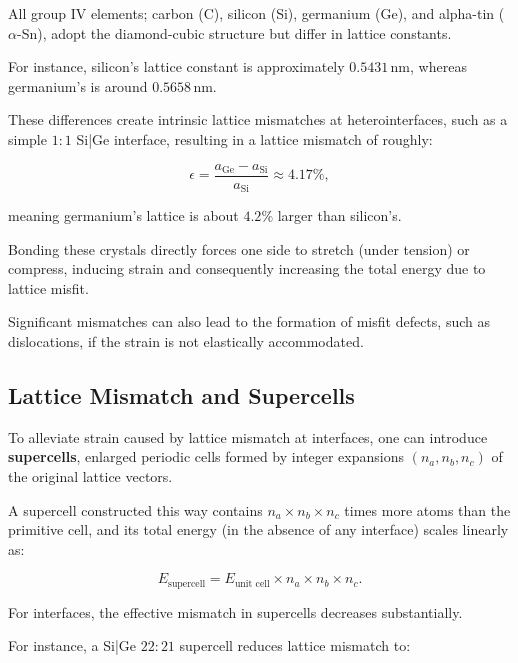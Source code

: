 
All group IV elements; carbon (C), silicon (Si), germanium (Ge), and alpha-tin (\(\alpha\)-Sn), adopt the diamond-cubic
structure but differ in lattice constants.

For instance, silicon's lattice constant is approximately \(0.5431\,\mathrm{nm}\), whereas germanium's is
around \(0.5658\,\mathrm{nm}\).

These differences create intrinsic lattice mismatches at heterointerfaces, such as a simple \(1{:}1\) Si|Ge interface,
resulting in a lattice mismatch of roughly:


\[
\epsilon = \frac{a_{\mathrm{Ge}} - a_{\mathrm{Si}}}{a_{\mathrm{Si}}} \approx 4.17\%,
\]


meaning germanium's lattice is about \(4.2\%\) larger than silicon's.

Bonding these crystals directly forces one side to stretch (under tension) or compress, inducing strain and consequently
increasing the total energy due to lattice misfit.

Significant mismatches can also lead to the formation of misfit defects, such as dislocations, if the strain is not
elastically accommodated\cite{artemis_paper}.

\subsection{Lattice Mismatch and Supercells}  \label{sec:lattice_mismatching}


To alleviate strain caused by lattice mismatch at interfaces, one can introduce \textbf{supercells}, enlarged periodic
cells formed by integer expansions \((n_a, n_b, n_c)\) of the original lattice vectors.

A supercell constructed this way contains \(n_a \times n_b \times n_c\) times more atoms than the primitive cell, and
its total energy (in the absence of any interface) scales linearly as:


\[
E_{\text{supercell}} = E_{\text{unit cell}} \times n_a \times n_b \times n_c.
\]


For interfaces, the effective mismatch in supercells decreases substantially.

For instance, a Si|Ge \(22{:}21\) supercell reduces lattice mismatch to:


